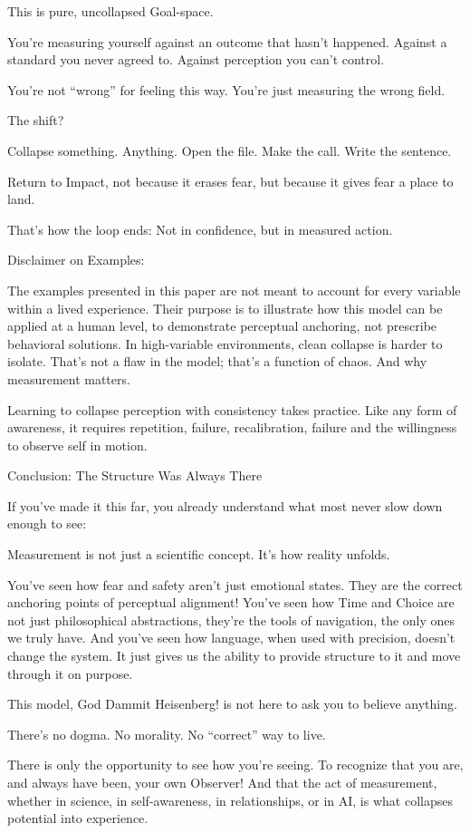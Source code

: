 \documentclass[11pt]{article}
\begin{document}
This is pure, uncollapsed Goal-space.

You’re measuring yourself against an outcome that hasn’t happened.
Against a standard you never agreed to.
Against perception you can’t control.

You’re not “wrong” for feeling this way.
You’re just measuring the wrong field.

The shift?

Collapse something. Anything.
Open the file. Make the call. Write the sentence.

Return to Impact, not because it erases fear, but because it gives fear a place to land.

That’s how the loop ends:
Not in confidence, but in measured action.

Disclaimer on Examples:

The examples presented in this paper are not meant to account for every variable within a lived experience. Their purpose is to illustrate how this model can be applied at a human level, to demonstrate perceptual anchoring, not prescribe behavioral solutions. In high-variable environments, clean collapse is harder to isolate. That’s not a flaw in the model; that’s a function of chaos. And why measurement matters.

Learning to collapse perception with consistency takes practice. Like any form of awareness, it requires repetition, failure, recalibration, failure and the willingness to observe self in motion.

Conclusion: The Structure Was Always There 

If you’ve made it this far, you already understand what most never slow down enough to see:

Measurement is not just a scientific concept.
It’s how reality unfolds.

You’ve seen how fear and safety aren’t just emotional states. They are the correct anchoring points of perceptual alignment!
You’ve seen how Time and Choice are not just philosophical abstractions, they’re the tools of navigation, the only ones we truly have.
And you’ve seen how language, when used with precision, doesn’t change the system.
It just gives us the ability to provide structure to it and move through it on purpose.

This model, God Dammit Heisenberg! is not here to ask you to believe anything.

There’s no dogma.
No morality.
No “correct” way to live.

There is only the opportunity to see how you're seeing.
To recognize that you are, and always have been, your own Observer!
And that the act of measurement, whether in science, in self-awareness, in relationships, or in AI, is what collapses potential into experience.
\end{document}
